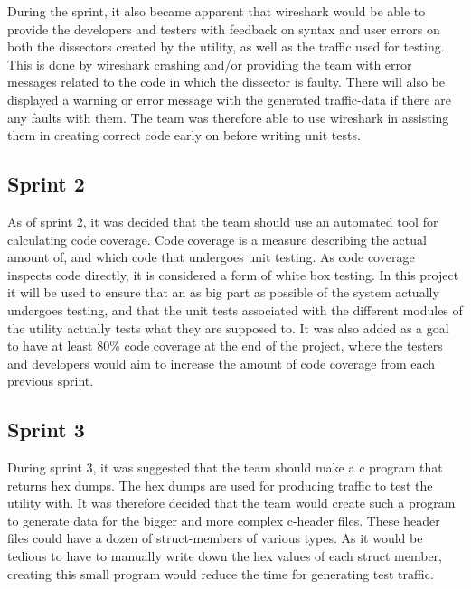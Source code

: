 During the sprint, it also became apparent that \Gls{wireshark} would be able to provide the developers and testers with feedback on syntax and user errors on both the \glspl{dissector} created by the \gls{utility}, as well as the traffic used for testing. This is done by \Gls{wireshark} crashing and/or providing the team with error messages related to the code in which the \gls{dissector} is faulty. There will also be displayed a warning or error message with the generated traffic-data if there are any faults with them. The team was therefore able to use \Gls{wireshark} in assisting them in creating correct code early on before writing unit tests.   

\subsection{Sprint 2}
As of sprint 2, it was decided that the team should use an automated tool for calculating code coverage. Code coverage is a measure describing the actual amount of, and which code that undergoes unit testing. As code coverage inspects code directly, it is considered a form of white box testing. In this project it will be used to ensure that an as big part as possible of the system actually undergoes testing, and that the unit tests associated with the different modules of the \gls{utility} actually tests what they are supposed to. It was also added as a goal to have at least 80\% code coverage at the end of the project, where the testers and developers would aim to increase the amount of code coverage from each previous sprint.

\subsection{Sprint 3}
During sprint 3, it was suggested that the team should make a \Gls{c} program that returns \glspl{hex dump}. The \glspl{hex dump} are used for producing traffic to test the \gls{utility} with. It was therefore decided that the team would create such a program to generate data for the bigger and more complex \Gls{c}-\gls{header} files.
These \gls{header} files could have a dozen of \gls{struct}-\glspl{member} of various types. As it would be tedious to have to manually write down the hex values of each \gls{struct} \gls{member}, creating this small program would reduce the time for generating test traffic.

